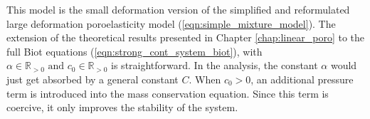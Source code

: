 \noindent This model is the small deformation version of the simplified and reformulated large deformation poroelasticity model (\ref{eqn:simple_mixture_model}). The extension of the theoretical results presented in Chapter \ref{chap:linear_poro} to the full Biot equations (\ref{eqn:strong_cont_system_biot}), with $\alpha \in \mathbb{R}_{> 0} \text{ and } c_{0}\in \mathbb{R}_{> 0}$ is straightforward. In the analysis, the constant $\alpha$ would just get absorbed by a general constant $C$. When $c_{0}>0$, an additional pressure term is introduced into the mass conservation equation. Since this term is coercive, it only improves the stability of the system.